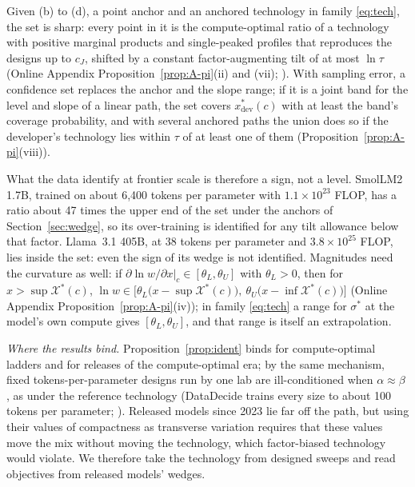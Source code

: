 Given (b) to (d), a point anchor and an anchored technology in family \eqref{eq:tech}, the set is sharp: every point
in it is the compute-optimal ratio of a technology with positive marginal products and single-peaked profiles that
reproduces the designs up to $c_J$, shifted by a constant factor-augmenting tilt of at most $\ln\tau$ (Online Appendix
Proposition~\ref{prop:A-pi}(ii) and (vii); \citealp{manski2003partial}). With sampling error, a confidence set replaces
the anchor and the slope range; if it is a joint band for the level and slope of a linear path, the set covers
$x^*_{\mathrm{dev}}(c)$ with at least the band's coverage probability, and with several anchored paths the union does
so if the developer's technology lies within $\tau$ of at least one of them (Proposition~\ref{prop:A-pi}(viii)).

What the data identify at frontier scale is therefore a sign, not a level. SmolLM2 1.7B, trained on about 6,400 tokens
per parameter with $1.1\times10^{23}$ FLOP, has a ratio about 47 times the upper end of the set under the anchors of
Section~\ref{sec:wedge}, so its over-training is identified for any tilt allowance below that factor. Llama~3.1 405B, at
38 tokens per parameter and $3.8\times10^{25}$ FLOP, lies inside the set: even the sign of its wedge is not identified.
Magnitudes need the curvature as well: if $\partial\ln w/\partial x|_c\in[\theta_L,\theta_U]$ with $\theta_L>0$, then
for $x>\sup\mathcal X^*(c)$, $\ln w\in\big[\theta_L\big(x-\sup\mathcal X^*(c)\big),\ \theta_U\big(x-\inf\mathcal X^*(c)\big)\big]$
(Online Appendix Proposition~\ref{prop:A-pi}(iv)); in family \eqref{eq:tech} a range for $\sigma^*$ at the model's own
compute gives $[\theta_L,\theta_U]$, and that range is itself an extrapolation.

\textit{Where the results bind.}\label{sec:ident-scope} Proposition~\ref{prop:ident} binds for compute-optimal ladders
and for releases of the compute-optimal era; by the same mechanism, fixed tokens-per-parameter designs run by one lab are
ill-conditioned when $\alpha\approx\beta$ \citep{kricheli2026tokens}, as under the reference technology (DataDecide trains every size to about 100
tokens per parameter; \citealp{magnusson2025datadecide}). Released models since 2023 lie far off
the path, but using their values of compactness as transverse variation requires that these values move the mix without
moving the technology, which factor-biased technology would violate. We therefore take the technology from designed
sweeps and read objectives from released models' wedges.
